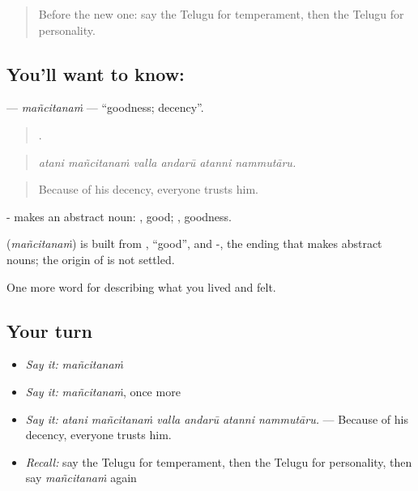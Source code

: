 \label{lesson:TE-C507-mancitanam}



\begin{quote}
Before the new one: say the Telugu for temperament, then the Telugu for personality.
\end{quote}

\subsection*{You'll want to know: }
\textbf{} — \emph{mañcitanaṁ} — \textquotedblleft{}goodness; decency\textquotedblright{}.

\begin{quote}
     .
\end{quote}

\begin{quote}
\emph{atani mañcitanaṁ valla andarū atanni nammutāru.}
\end{quote}

\begin{quote}
Because of his decency, everyone trusts him.
\end{quote}

- makes an abstract noun: , good; , goodness.

\begin{cousinweb}
\textbf{} (\emph{mañcitanaṁ}) is built from , \textquotedblleft{}good\textquotedblright{}, and -, the ending that makes abstract nouns; the origin of  is not settled.
\end{cousinweb}

\begin{grammarlens}[title={What you've built}]
One more word for describing what you lived and felt.
\end{grammarlens}

\subsection*{Your turn}
\begin{itemize}
\raggedright
  \item \emph{Say it:} \emph{mañcitanaṁ}
  \item \emph{Say it:} \emph{mañcitanaṁ}, once more
  \item \emph{Say it:} \emph{atani mañcitanaṁ valla andarū atanni nammutāru.} — Because of his decency, everyone trusts him.
  \item \emph{Recall:} say the Telugu for temperament, then the Telugu for personality, then say \emph{mañcitanaṁ} again
\end{itemize}

